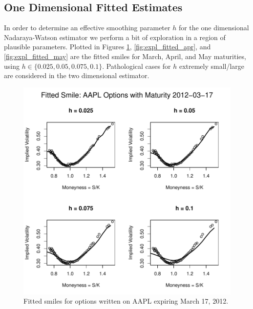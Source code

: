 \documentclass[11pt]{article}
\newlength\tindent
\renewcommand{\indent}{\hspace*{\tindent}}
\begin{document}
\subsection{One Dimensional Fitted Estimates}

\indent In order to determine an effective smoothing parameter $h$ for the one dimensional Nadaraya-Watson estimator we perform a bit of exploration in a region of plausible parameters. Plotted in Figures \ref{fig:expl_fitted_mar}, \ref{fig:expl_fitted_apr}, and \ref{fig:expl_fitted_may} are the fitted smiles for March, April, and May maturities, using $h \in \{0.025, 0.05, 0.075, 0.1\}$. Pathological cases for $h$ extremely small/large are considered in the two dimensional estimator.

\begin{figure}[H]
	\centering
 	\includegraphics{../plots/q2/expl_fitted_smile_mar.pdf}
\caption{Fitted smiles for options written on AAPL expiring March 17, 2012.}
\label{fig:expl_fitted_mar}
\end{figure}
\end{document}
